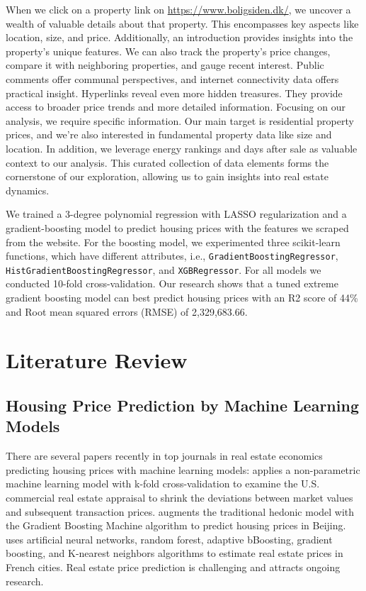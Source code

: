 \documentclass[12pt]{article} %
\begin{document}
{        When we click on a property link on \url{https://www.boligsiden.dk/}, we uncover a wealth of valuable details about that property. This encompasses key aspects like location, size, and price. Additionally, an introduction provides insights into the property's unique features. We can also track the property's price changes, compare it with neighboring properties, and gauge recent interest. Public comments offer communal perspectives, and internet connectivity data offers practical insight. Hyperlinks reveal even more hidden treasures. They provide access to broader price trends and more detailed information. Focusing on our analysis, we require specific information. Our main target is residential property prices, and we're also interested in fundamental property data like size and location. In addition, we leverage energy rankings and days after sale as valuable context to our analysis. This curated collection of data elements forms the cornerstone of our exploration, allowing us to gain insights into real estate dynamics.

        We trained a 3-degree polynomial regression with LASSO regularization and a gradient-boosting model to predict housing prices with the features we scraped from the website. For the boosting model, we experimented three scikit-learn functions, which have different attributes, i.e., \texttt{GradientBoostingRegressor}, \texttt{HistGradientBoostingRegressor}, and \texttt{XGBRegressor}. For all models we conducted 10-fold cross-validation. Our research shows that a tuned extreme gradient boosting model can best predict housing prices with an R2 score of 44\% and Root mean squared errors (RMSE) of 2,329,683.66. 
        				

\section{Literature Review}
\subsection{Housing Price Prediction by Machine Learning Models}
		There are several papers recently in top journals in real estate economics predicting housing prices with machine learning models: 		\cite{Deppneretal2023} applies a non-parametric machine learning model with k-fold cross-validation to examine the U.S. commercial real estate appraisal to shrink the deviations between market values and subsequent transaction prices.	\cite{Linetal2023} augments the traditional hedonic model with the Gradient Boosting Machine algorithm to predict housing prices in Beijing. \cite{TchuenteNyawa2022} uses artificial neural networks, random forest, adaptive bBoosting, gradient boosting, and K-nearest neighbors algorithms to estimate real estate prices in French cities. Real estate price prediction is challenging and attracts ongoing research. 

}
\end{document}
